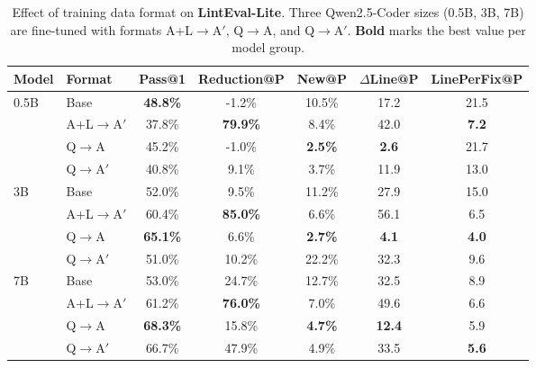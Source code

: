 \begin{table}[t]
\centering
\small
\begin{tabular}{llccccc}
\toprule
\textbf{Model} & \textbf{Format} & \textbf{Pass@1} & \textbf{Reduction@P} & \textbf{New@P} & \textbf{$\Delta$Line@P} & \textbf{LinePerFix@P} \\
\midrule
\multirow{4}{*}{0.5B} & Base & \textbf{48.8\%} & -1.2\% & 10.5\% & 17.2 & 21.5 \\
 & A+L$\rightarrow$A$'$ & 37.8\% & \textbf{79.9\%} & 8.4\% & 42.0 & \textbf{7.2} \\
 & Q$\rightarrow$A & 45.2\% & -1.0\% & \textbf{2.5\%} & \textbf{2.6} & 21.7 \\
 & Q$\rightarrow$A$'$ & 40.8\% & 9.1\% & 3.7\% & 11.9 & 13.0 \\
\midrule
\multirow{4}{*}{3B} & Base & 52.0\% & 9.5\% & 11.2\% & 27.9 & 15.0 \\
 & A+L$\rightarrow$A$'$ & 60.4\% & \textbf{85.0\%} & 6.6\% & 56.1 & 6.5 \\
 & Q$\rightarrow$A & \textbf{65.1\%} & 6.6\% & \textbf{2.7\%} & \textbf{4.1} & \textbf{4.0} \\
 & Q$\rightarrow$A$'$ & 51.0\% & 10.2\% & 22.2\% & 32.3 & 9.6 \\
\midrule
\multirow{4}{*}{7B} & Base & 53.0\% & 24.7\% & 12.7\% & 32.5 & 8.9 \\
 & A+L$\rightarrow$A$'$ & 61.2\% & \textbf{76.0\%} & 7.0\% & 49.6 & 6.6 \\
 & Q$\rightarrow$A & \textbf{68.3\%} & 15.8\% & \textbf{4.7\%} & \textbf{12.4} & 5.9 \\
 & Q$\rightarrow$A$'$ & 66.7\% & 47.9\% & 4.9\% & 33.5 & \textbf{5.6} \\
\bottomrule
\end{tabular}
\caption{Effect of training data format on \textbf{LintEval-Lite}. Three Qwen2.5-Coder sizes (0.5B, 3B, 7B) are fine-tuned with formats A+L$\rightarrow$A$'$, Q$\rightarrow$A, and Q$\rightarrow$A$'$. \textbf{Bold} marks the best value per model group.}
\label{tab:sft_results}
\end{table}